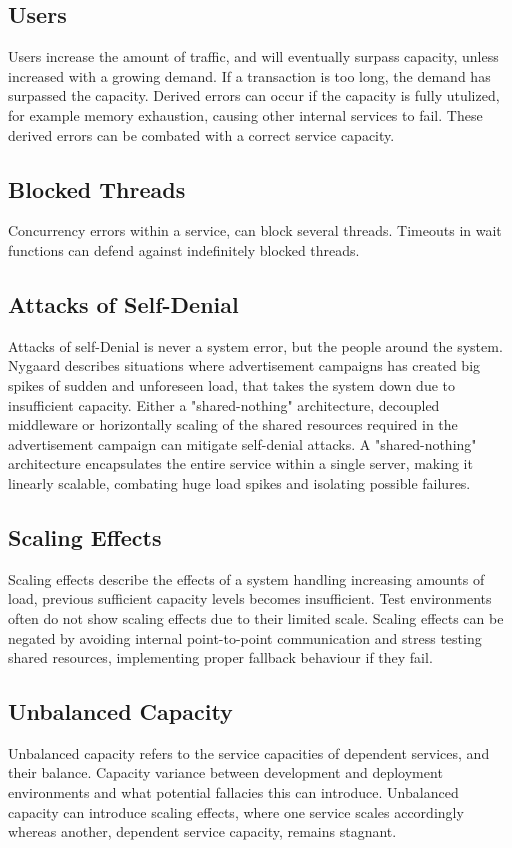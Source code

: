 \subsection{Users}
Users increase the amount of traffic, and will eventually surpass capacity, unless increased with a growing demand. If a transaction is too long, the demand has surpassed the capacity. Derived errors can occur if the capacity is fully utulized, for example memory exhaustion, causing other internal services to fail. These derived errors can be combated with a correct service capacity.

\subsection{Blocked Threads}
Concurrency errors within a service, can block several threads. Timeouts in wait functions can defend against indefinitely blocked threads.

\subsection{Attacks of Self-Denial}
Attacks of self-Denial is never a system error, but the people around the system. Nygaard describes situations where advertisement campaigns has created big spikes of sudden and unforeseen load, that takes the system down due to insufficient capacity. 
Either a "shared-nothing" architecture, decoupled middleware or horizontally scaling of the shared resources required in the advertisement campaign can mitigate self-denial attacks. A "shared-nothing" architecture encapsulates the entire service within a single server, making it linearly scalable, combating huge load spikes and isolating possible failures.

\subsection{Scaling Effects}
Scaling effects describe the effects of a system handling increasing amounts of load, previous sufficient capacity levels becomes insufficient. Test environments often do not show scaling effects due to their limited scale.
Scaling effects can be negated by avoiding internal point-to-point communication and stress testing shared resources, implementing proper fallback behaviour if they fail.

\subsection{Unbalanced Capacity}
Unbalanced capacity refers to the service capacities of dependent services, and their balance. Capacity variance between development and deployment environments and what potential fallacies this can introduce. Unbalanced capacity can introduce scaling effects, where one service scales accordingly whereas another, dependent service capacity, remains stagnant.

